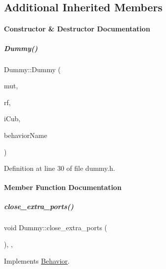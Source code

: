 \subsection*{Additional Inherited Members}


\paragraph{Constructor \& Destructor Documentation}
\mbox{\label{group__behaviorManager_ab859dd9c4a1d1ca5a3e452bd277b9ee3}} 
\subparagraph{\texorpdfstring{Dummy()}{Dummy()}}
{\footnotesize\ttfamily Dummy\+::\+Dummy (\begin{DoxyParamCaption}\item[{yarp\+::os\+::\+Mutex $\ast$}]{mut,  }\item[{yarp\+::os\+::\+Resource\+Finder \&}]{rf,  }\item[{\hyperlink{group__icubclient__clients_classicubclient_1_1ICubClient}{icubclient\+::\+I\+Cub\+Client} $\ast$}]{i\+Cub,  }\item[{std\+::string}]{behavior\+Name }\end{DoxyParamCaption})\hspace{0.3cm}{\ttfamily [inline]}}



Definition at line 30 of file dummy.\+h.



\paragraph{Member Function Documentation}
\mbox{\label{group__behaviorManager_aebfb66e2a5a0088968bf792f3adb1942}} 
\subparagraph{\texorpdfstring{close\+\_\+extra\+\_\+ports()}{close\_extra\_ports()}}
{\footnotesize\ttfamily void Dummy\+::close\+\_\+extra\+\_\+ports (\begin{DoxyParamCaption}{ }\end{DoxyParamCaption})\hspace{0.3cm}{\ttfamily [inline]}, {\ttfamily [protected]}, {\ttfamily [virtual]}}



Implements \hyperlink{group__behaviorManager_affd22d1516cd32ff4f42694a1e6f9ab1}{Behavior}.



